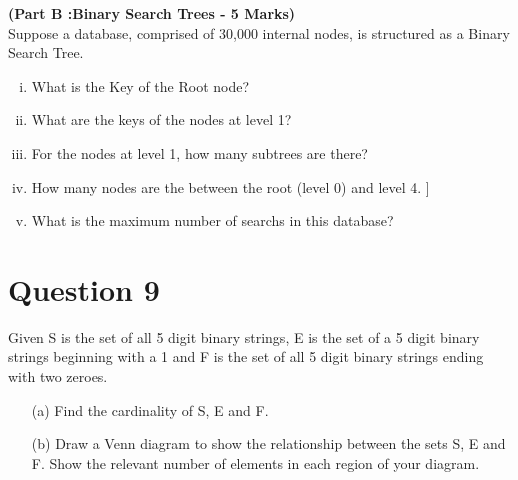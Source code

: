 \documentclass[]{report}
\begin{document}
\noindent \textbf{(Part B :Binary Search Trees -  5 Marks) }\\
Suppose a database, comprised of 30,000 internal nodes, is structured as a Binary Search Tree.

\begin{enumerate}[(i)]
	\item What is the Key of the Root node?
	\item What are the keys of the nodes at level 1?
	\item For the nodes at level 1, how many subtrees are there?
	\item How many nodes are the between the root (level 0) and level 4. ]
	\item What is the maximum number of searchs in this database?
\end{enumerate}


\section*{ Question 9 }
Given S is the set of all 5 digit binary strings, E is the set of a 5 digit
binary strings beginning with a 1 and F is the set of all 5 digit binary strings ending
with two zeroes.
\begin{itemize}
	\item[(a)] Find the cardinality of S, E and F.
	\item[(b)] Draw a Venn diagram to show the relationship between the sets S, E and F.
	Show the relevant number of elements in each region of your diagram.
\end{itemize}
\end{document}
